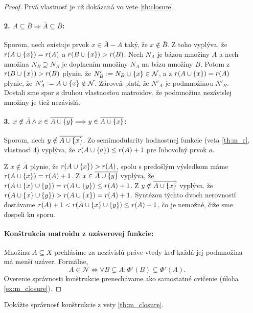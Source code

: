 \begin{proof}
Prvá vlastnosť je už dokázaná vo vete \ref{th:closure}.
\paragraph{2. $A \subseteq \bar{B} \Longrightarrow \bar{A} \subseteq \bar{B}$:}
Sporom, nech existuje prvok $x \in \bar{A} - A$ taký, že $x \notin \bar{B}$.
Z toho vyplýva, že $r(A \cup \left\{x\right\}) = r(A)$ a $r(B \cup \left\{x\right\}) > r(B)$.
Nech $N_A$ je bázou množiny $A$ a nech množina $N_B \supseteq N_A$ je doplnením množiny $N_A$ na bázu množiny $B$.
Potom z $r(B \cup \left\{x\right\}) > r(B)$ plynie, že $N'_B := N_B \cup \left\{x\right\} \in \mathcal{N}$, a z $r(A \cup \left\{x\right\}) = r(A)$ plynie, že $N'_A := A \cup \left\{x\right\} \notin \mathcal{N}$.
Zároveň platí, že $N'_A$ je podmnožinou $N'_B$.
Dostali sme spor s druhou vlastnosťou matroidov, že podmnožina nezávislej množiny je tiež nezávislá.
\paragraph{3. $x \not\in \bar{A} \wedge x \in \overline{A \cup \left\{y\right\}} \Longrightarrow y \in \overline{A \cup \left\{x\right\}}$:}
Sporom, nech $y \notin\overline{A \cup \left\{x\right\}}$.
Zo semimodularity hodnostnej funkcie (veta \ref{th:m_r}, vlastnosť 4) vyplýva, že $r(A \cup \left\{a\right\}) \leq r(A) + 1$ pre ľubovoľný prvok $a$.

Z $x \not\in \bar{A}$ plynie, že $r(A \cup \left\{x\right\}) > r(A)$, spolu s predošlým výsledkom máme $r(A \cup \left\{x\right\}) = r(A) + 1$.
Z $x \in \overline{A \cup \left\{y\right\}}$ vyplýva, že $r(A \cup \left\{x\right\} \cup \left\{y\right\}) = r(A \cup \left\{y\right\}) \leq r(A) + 1$.
Z $y \notin\overline{A \cup \left\{x\right\}}$ vyplýva, že $r(A \cup \left\{x\right\} \cup \left\{y\right\}) > r(A \cup \left\{x\right\}) = r(A) + 1$.
Syntézou týchto dvoch nerovností dostávame $r(A) + 1 < r(A \cup \left\{x\right\} \cup \left\{y\right\}) \leq r(A) + 1$, čo je nemožné, čiže sme dospeli ku sporu.
\paragraph{Konštrukcia matroidu z uzáverovej funkcie:}
Množinu $A \subseteq X$ prehlásime za nezávislú práve vtedy keď každá jej podmnožina má menší uzáver.
Formálne, $$A \in \mathcal{N} \Longleftrightarrow \forall B \subsetneq A: \Phi'(B) \subsetneq \Phi'(A).$$
Overenie správnosti konštrukcie prenechávame ako samostatné cvičenie (úloha \ref{ex:m_closure}).
\end{proof}
\begin{exercise}
\label{ex:m_closure}
Dokážte správnosť konštrukcie z vety \ref{th:m_closure}.
\end{exercise}

